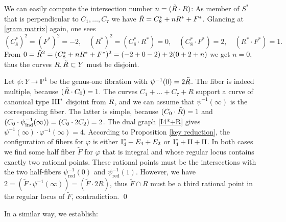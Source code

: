 \documentclass[oneside, 12pt]{amsart}
\theoremstyle{definition}
\theoremstyle{remark}
\newcommand{\PP}{\mathbb{P}}
\newcommand{\I}{\text{\rm I}}
\newcommand{\II}{\text{\rm II}}
\newcommand{\III}{\text{\rm III}}
\newcommand{\ra}{\rightarrow}
\newcommand{\red}{{\operatorname{red}}}
\newcommand{\ind}{\text{\rm ind}}
\newcommand{\inv}{{-1}}
\begin{document}
We can easily compute the intersection number    $n=(\tilde{R}\cdot R)$: As member of $S^*$ that is perpendicular to $C_1,\ldots,C_7$ we   have
$\tilde{R} = C_8^*+ nR^* + F^*$.  Glancing at  \eqref{gram matrix} again, one sees  
$$
(C_8^*)^2=(F^*)^2=-2,\quad (R^*)^2= (C_8^*\cdot R^*) = 0,\quad (C_8^*\cdot F^*) = 2,\quad (R^*\cdot F^*) = 1.
$$
From
$0=\tilde{R}^2=(C_8^*+ nR^* + F^*)^2 = (-2 + 0 -2) + 2(0+2+n)$ we get $n=0$, thus the curves $R,\tilde{R}\subset Y$ must be disjoint.
 
Let $\psi:Y\ra\PP^1$ be the   genus-one fibration with $\psi^{-1}(0)=2\tilde{R}$.  The fiber is indeed multiple,
because $(\tilde{R}\cdot C_0)=1$.  The curves $C_1+\ldots+C_7+R$ support a curve of canonical type $\III^*$ disjoint from $\tilde{R}$,
and we can assume that $\psi^{-1}(\infty)$ is the corresponding fiber. The latter is simple, because
$(C_0\cdot \tilde{R})=1$ and $(C_0\cdot\psi^{-1}_\ind(\infty)) = (C_0\cdot 2C_2)=2$. The dual graph \eqref{I4*+R} gives 
$\psi^{-1}(\infty)\cdot \varphi^{-1}(\infty)=4$.
According to Proposition \ref{key reduction}, the configuration of fibers   for $\varphi$ is either $\I_4^*+E_4+E_2$ or $\I_4^*+\II+\II$.
In both cases we find some half fiber $\tilde{F}$ for $\varphi$ that is integral and whose  regular locus contains exactly two    rational points.
These rational points must be the intersections with the two half-fibers $\psi^{-1}_\red(0)$ and $\psi^\inv_\red(1)$.
However, we have $2=(\tilde{F}\cdot \psi^{-1}(\infty))=(\tilde{F}\cdot 2R)$, thus $\tilde{F}\cap R$ must be a third rational point in the regular locus of $\tilde{F}$,
contradiction.
\qed

\medskip
In a similar way, we establish:
\end{document}
